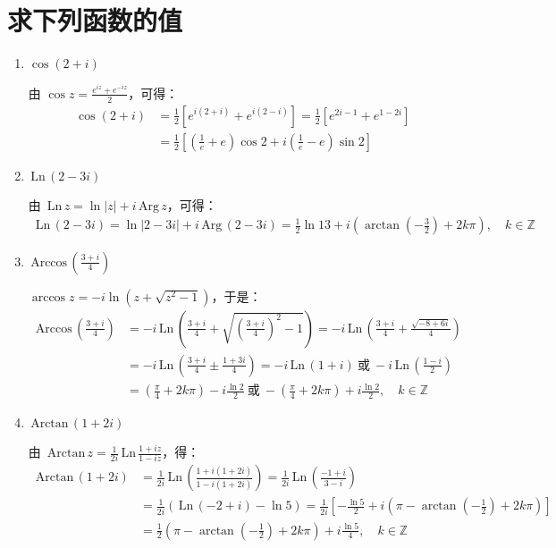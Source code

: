 \documentclass[UTF8]{report}
\def\Ln{\mathrm{\,Ln\,}}
\def\Arg{\mathrm{\,Arg\,}}
\def\Arccos{\mathrm{\,Arccos\,}}
\def\Arctan{\mathrm{\,Arctan\,}}
\theoremstyle{MyLineTheoremStyle} %
\theoremstyle{MyBlockTheoremStyle} %
\theoremstyle{MySubsubsectionStyle} %
\begin{document}
\section{求下列函数的值}
\begin{enumerate}
\item $\cos(2+i)$

由 $\cos z = \frac{e^{iz} + e^{-iz}}{2}$，可得：
\begin{align*}
\cos(2+i) 
&= \frac{1}{2}\left[  e^{i(2+i)} + e^{i(2-i)}  \right] = \frac{1}{2}\left[ e^{2i -1} + e^{1-2i} \right] \\
&= \frac{1}{2}\left[ (\frac{1}{e} + e)\cos 2 + i(\frac{1}{e}-e)\sin 2\right]
\end{align*}

\item $\Ln(2-3i)$

由 $\Ln z = \ln | z | + i\Arg z$，可得：
\begin{align*}
\Ln (2-3i) = \ln | 2-3i | + i\Arg (2-3i)
= \frac{1}{2}\ln 13 + i\left(\arctan (-\frac{3}{2}) + 2k\pi\right),\quad k \in \mathbb{Z}
\end{align*}

\item $\Arccos (\frac{3+i}{4})$

$\arccos z = -i \ln (z + \sqrt{z^2 -1} )$，于是：
\begin{align*}
\Arccos (\frac{3+i}{4}) 
&= -i \Ln\left(\frac{3+i}{4} + \sqrt{(\frac{3+i}{4})^2 -1} \right) = -i \Ln \left( \frac{3+i}{4} + \frac{\sqrt{-8 + 6i} }{4} \right) \\ 
&= -i \Ln \left( \frac{3+i}{4} \pm \frac{1 + 3i}{4} \right) = -i \Ln(1+i)\  \text{或}\ -i \Ln(\frac{1-i}{2}) \\ 
&= (\frac{\pi}{4} + 2k\pi) - i\frac{\ln 2}{2} \ \text{或}\ -(\frac{\pi}{4} + 2k\pi) + i\frac{\ln 2}{2},\quad k \in \mathbb{Z}
\end{align*}

\item $\Arctan (1+2i)$

由 $\Arctan z = \frac{1}{2i} \Ln \frac{1+iz}{1-iz}$，得：
\begin{align*}
\Arctan (1+2i) 
&= \frac{1}{2i}\Ln \left( \frac{1+i(1+2i)}{1-i(1+2i)} \right)
= \frac{1}{2i}\Ln \left( \frac{-1 + i}{3-i} \right) \\
&= \frac{1}{2i}\left( \Ln (-2+i) - \ln 5 \right) 
= \frac{1}{2i}\left[ -\frac{\ln 5}{2}  + i\left( \pi - \arctan(-\frac{1}{2})  + 2k\pi\right) \right] \\ 
&= \frac{1}{2}\left(\pi - \arctan(-\frac{1}{2})  + 2k\pi\right) + i\frac{\ln 5}{4},\quad k \in \mathbb{Z}
\end{align*}
\end{enumerate}
\end{document}
